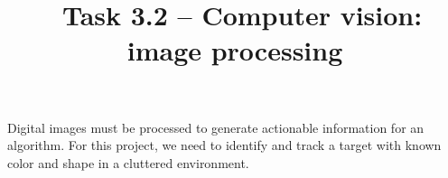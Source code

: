 \documentclass{tufte-handout}
\title{\usnaCourseNumber\ Task 3.2 -- Computer vision: image processing}
\author{\usnaInstructorShort}
\date{\printdate{\courseWeekTwo}}
\begin{document}
\maketitle
Digital images must be processed to generate actionable information for an algorithm. For this project, we need to identify and track a target with known color and shape in a cluttered environment.
\end{document}
